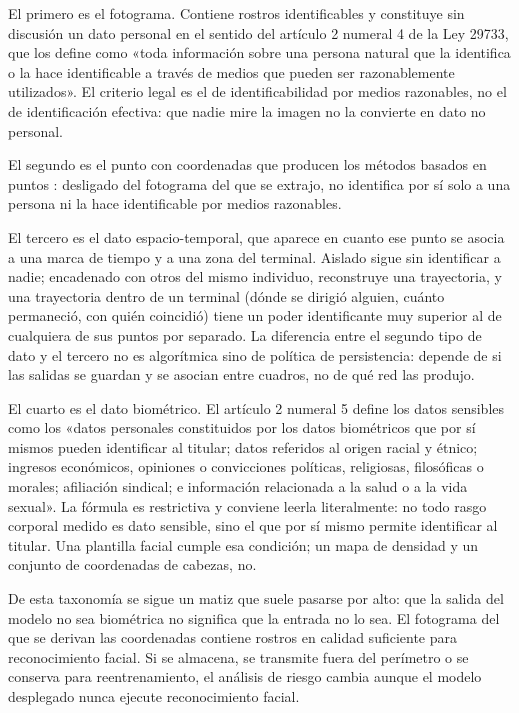 El primero es el fotograma. Contiene rostros identificables y constituye
sin discusión un dato personal en el sentido del artículo 2 numeral 4 de
la Ley 29733, que los define como «toda información sobre una persona
natural que la identifica o la hace identificable a través de medios que
pueden ser razonablemente utilizados». El criterio legal es el de
identificabilidad por medios razonables, no el de identificación
efectiva: que nadie mire la imagen no la convierte en dato no personal.

El segundo es el punto con coordenadas que producen los métodos basados
en puntos \cite{Song_2021_ICCV,Lin_2025_CVPR}: desligado del fotograma
del que se extrajo, no identifica por sí solo a una persona ni la hace
identificable por medios razonables.

El tercero es el dato espacio-temporal, que aparece en cuanto ese punto
se asocia a una marca de tiempo y a una zona del terminal. Aislado sigue
sin identificar a nadie; encadenado con otros del mismo individuo,
reconstruye una trayectoria, y una trayectoria dentro de un terminal
(dónde se dirigió alguien, cuánto permaneció, con quién coincidió) tiene
un poder identificante muy superior al de cualquiera de sus puntos por
separado. La diferencia entre el segundo tipo de dato y el tercero no es
algorítmica sino de política de persistencia: depende de si las salidas
se guardan y se asocian entre cuadros, no de qué red las produjo.

El cuarto es el dato biométrico. El artículo 2 numeral 5 define los
datos sensibles como los «datos personales constituidos por los datos
biométricos que por sí mismos pueden identificar al titular; datos
referidos al origen racial y étnico; ingresos económicos, opiniones o
convicciones políticas, religiosas, filosóficas o morales; afiliación
sindical; e información relacionada a la salud o a la vida sexual». La
fórmula es restrictiva y conviene leerla literalmente: no todo rasgo
corporal medido es dato sensible, sino el que por sí mismo permite
identificar al titular. Una plantilla facial cumple esa condición; un
mapa de densidad y un conjunto de coordenadas de cabezas, no.

De esta taxonomía se sigue un matiz que suele pasarse por alto: que la
salida del modelo no sea biométrica no significa que la entrada no lo
sea. El fotograma del que se derivan las coordenadas contiene rostros en
calidad suficiente para reconocimiento facial. Si se almacena, se
transmite fuera del perímetro o se conserva para reentrenamiento, el
análisis de riesgo cambia aunque el modelo desplegado nunca ejecute
reconocimiento facial.

